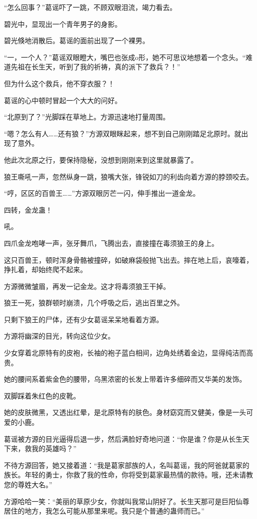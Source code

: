 \begin{this_body}
“怎么回事？”葛谣吓了一跳，不顾双眼泪流，竭力看去。

碧光中，显现出一个青年男子的身影。

碧光倏地消散后。葛谣的面前出现了一个裸男。

“一，一个人？”葛谣双眼瞪大，嘴巴也张成o形，她不可思议地想着一个念头。“难道先祖在长生天，听到了我的祈祷，真的派下了救兵？！”

但为什么这个救兵，他不穿衣服？！

葛谣的心中顿时冒起一个大大的问好。

“北原到了？”光脚踩在草地上。方源迅速地打量周围。

“嗯？怎么有人……还有狼？”方源双眼眯起来，想不到自己刚刚踏足北原时。就出现了意外。

他此次北原之行，要保持隐秘，没想到刚刚来到这里就暴露了。

狼王嘶吼一声，忽然纵身一跳，狼嘴大张，锋锐如刀的利齿向着方源的脖颈咬去。

“哼，区区的百兽王……”方源双眼厉芒一闪，伸手推出一道金龙。

四转，金龙蛊！

吼。

四爪金龙咆哮一声，张牙舞爪，飞腾出去，直接撞在毒须狼王的身上。

这只百兽王，顿时浑身骨骼被撞碎，如破麻袋般抛飞出去。摔在地上后，哀嚎着，挣扎着，却始终爬不起来。

方源微微皱眉，再发一记金龙。这才将毒须狼王干掉。

狼王一死，狼群顿时崩溃，几个呼吸之后，逃出百里之外。

只剩下狼王的尸体，还有少女葛谣呆呆地看着方源。

方源将幽深的目光，转向这位少女。

少女穿着北原特有的皮袍，长袖的袍子蓝白相间，边角处绣着金边，显得纯洁而高贵。

她的腰间系着紫金色的腰带，乌黑浓密的长发上带着许多细碎而又华美的发饰。

双脚踩着朱红色的皮靴。

她的皮肤微黑，又透出红晕，是北原特有的肤色。身材窈窕而又健美，像是一头可爱的小鹿。

葛谣被方源的目光逼得后退一步，然后满脸好奇地问道：“你是谁？你是从长生天下来，救我的英雄吗？”

不待方源回答，她又接着道：“我是葛家部族的人，名叫葛谣，我的阿爸就葛家的族长。年轻的勇士，你救了我的性命，你将受到葛家最热情的款待。哦，还未请教您的尊姓大名。”

方源哈哈一笑：“美丽的草原少女，你就叫我常山阴好了。长生天那可是巨阳仙尊居住的地方，我怎么可能从那里来呢。我只是个普通的蛊师而已。”


\end{this_body}
